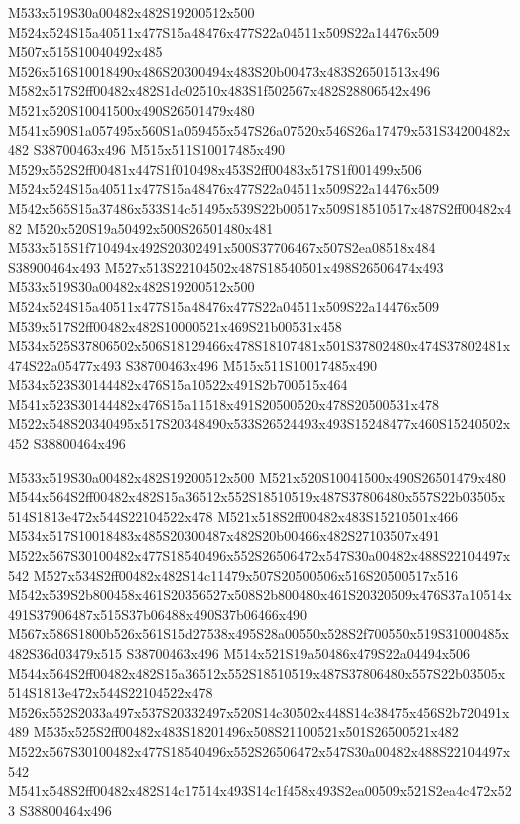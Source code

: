 \documentclass{article}
\begin{document}
\begin{multicols}{2}
M533x519S30a00482x482S19200512x500 M524x524S15a40511x477S15a48476x477S22a04511x509S22a14476x509 M507x515S10040492x485 M526x516S10018490x486S20300494x483S20b00473x483S26501513x496 M582x517S2ff00482x482S1dc02510x483S1f502567x482S28806542x496 M521x520S10041500x490S26501479x480 M541x590S1a057495x560S1a059455x547S26a07520x546S26a17479x531S34200482x482 S38700463x496 M515x511S10017485x490 M529x552S2ff00481x447S1f010498x453S2ff00483x517S1f001499x506 M524x524S15a40511x477S15a48476x477S22a04511x509S22a14476x509 M542x565S15a37486x533S14c51495x539S22b00517x509S18510517x487S2ff00482x482 M520x520S19a50492x500S26501480x481 M533x515S1f710494x492S20302491x500S37706467x507S2ea08518x484 S38900464x493 M527x513S22104502x487S18540501x498S26506474x493 M533x519S30a00482x482S19200512x500 M524x524S15a40511x477S15a48476x477S22a04511x509S22a14476x509 M539x517S2ff00482x482S10000521x469S21b00531x458 M534x525S37806502x506S18129466x478S18107481x501S37802480x474S37802481x474S22a05477x493 S38700463x496 M515x511S10017485x490 M534x523S30144482x476S15a10522x491S2b700515x464 M541x523S30144482x476S15a11518x491S20500520x478S20500531x478 M522x548S20340495x517S20348490x533S26524493x493S15248477x460S15240502x452 S38800464x496

M533x519S30a00482x482S19200512x500 M521x520S10041500x490S26501479x480 M544x564S2ff00482x482S15a36512x552S18510519x487S37806480x557S22b03505x514S1813e472x544S22104522x478 M521x518S2ff00482x483S15210501x466 M534x517S10018483x485S20300487x482S20b00466x482S27103507x491 M522x567S30100482x477S18540496x552S26506472x547S30a00482x488S22104497x542 M527x534S2ff00482x482S14c11479x507S20500506x516S20500517x516 M542x539S2b800458x461S20356527x508S2b800480x461S20320509x476S37a10514x491S37906487x515S37b06488x490S37b06466x490 M567x586S1800b526x561S15d27538x495S28a00550x528S2f700550x519S31000485x482S36d03479x515 S38700463x496 M514x521S19a50486x479S22a04494x506 M544x564S2ff00482x482S15a36512x552S18510519x487S37806480x557S22b03505x514S1813e472x544S22104522x478 M526x552S2033a497x537S20332497x520S14c30502x448S14c38475x456S2b720491x489 M535x525S2ff00482x483S18201496x508S21100521x501S26500521x482 M522x567S30100482x477S18540496x552S26506472x547S30a00482x488S22104497x542 M541x548S2ff00482x482S14c17514x493S14c1f458x493S2ea00509x521S2ea4c472x523 S38800464x496


\end{multicols}
\end{document}
